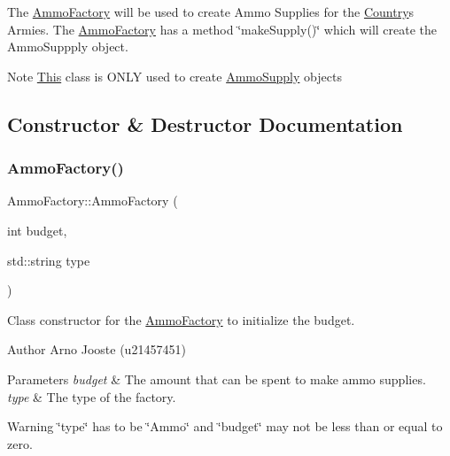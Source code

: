 The \mbox{\hyperlink{class_ammo_factory}{Ammo\+Factory}} will be used to create Ammo Supplies for the \mbox{\hyperlink{class_country}{Country}}\textquotesingle{}s Armies. The \mbox{\hyperlink{class_ammo_factory}{Ammo\+Factory}} has a method \char`\"{}make\+Supply()\char`\"{} which will create the Ammo\+Suppply object. \begin{DoxyNote}{Note}
\mbox{\hyperlink{class_this}{This}} class is O\+N\+LY used to create \mbox{\hyperlink{class_ammo_supply}{Ammo\+Supply}} objects 
\end{DoxyNote}


\subsection{Constructor \& Destructor Documentation}
\mbox{\label{class_ammo_factory_aab95615266049285e200316183a7f15e}} 
\subsubsection{\texorpdfstring{AmmoFactory()}{AmmoFactory()}}
{\footnotesize\ttfamily Ammo\+Factory\+::\+Ammo\+Factory (\begin{DoxyParamCaption}\item[{int}]{budget,  }\item[{std\+::string}]{type }\end{DoxyParamCaption})}



Class constructor for the \mbox{\hyperlink{class_ammo_factory}{Ammo\+Factory}} to initialize the budget. 

\begin{DoxyAuthor}{Author}
Arno Jooste (u21457451) 
\end{DoxyAuthor}

\begin{DoxyParams}{Parameters}
{\em budget} & The amount that can be spent to make ammo supplies. \\
\hline
{\em type} & The type of the factory. \\
\hline
\end{DoxyParams}
\begin{DoxyWarning}{Warning}
\char`\"{}type\char`\"{} has to be \char`\"{}\+Ammo\char`\"{} and \char`\"{}budget\char`\"{} may not be less than or equal to zero. 
\end{DoxyWarning}


